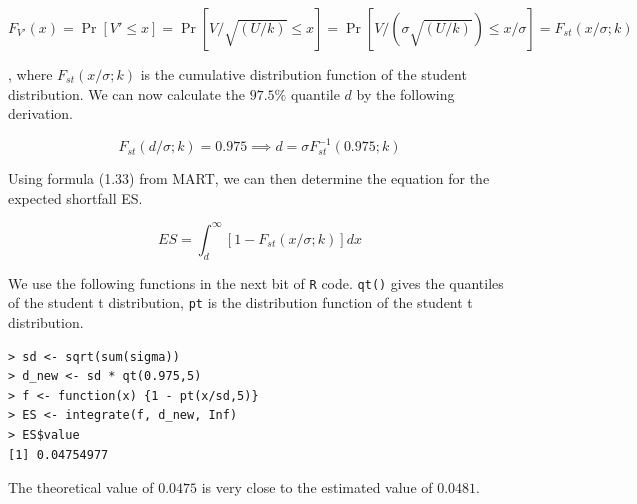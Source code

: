 \begin{equation}
F_{V'}(x) = \Pr[V' \le x] = \Pr[V/\sqrt{(U/k)} \le x] = \Pr[V/(\sigma \sqrt{(U/k)}) \le x/\sigma] = F_{st}(x/\sigma;k) 
\end{equation}

, where $F_{st}(x/\sigma;k)$ is the cumulative distribution function of the student distribution. We can now calculate the $97.5\%$ quantile $d$ by the following derivation.

\begin{equation}
F_{st}(d/\sigma;k) = 0.975 \implies d = \sigma F^{-1}_{st}(0.975;k) 
\end{equation}

Using formula (1.33) from MART, we can then determine the equation for the expected shortfall ES.

\begin{equation}
ES = \int_{d}^{\infty}[1-F_{st}(x/\sigma;k)]  dx
\end{equation}

We use the following functions in the next bit of \verb|R| code. \verb|qt()| gives the quantiles of the student t distribution, \verb|pt| is the distribution function of the student t distribution. 

\begin{verbatim}
> sd <- sqrt(sum(sigma))
> d_new <- sd * qt(0.975,5) 
> f <- function(x) {1 - pt(x/sd,5)}
> ES <- integrate(f, d_new, Inf)
> ES$value
[1] 0.04754977
\end{verbatim}

The theoretical value of $0.0475$ is very close to the estimated value of $0.0481$.